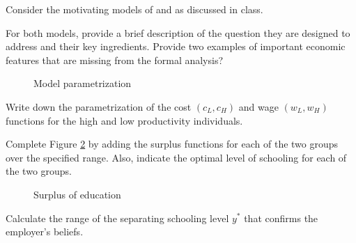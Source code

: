 Consider the motivating models of \cite{Spence.1973} and \cite{Ben-Porath.1967} as discussed in class.

\begin{boenumerate}
\item For both models, provide a brief description of the question they are designed to address and their key ingredients. Provide two examples of important economic features that are missing from the formal analysis?\\


\begin{figure}[h]\centering
\caption{Model parametrization}\label{Model parametrization}
\end{figure}

\item Write down the parametrization of the cost $(c_L, c_H)$ and wage $(w_L, w_H)$ functions for the high and low productivity individuals.

\item Complete Figure \ref{Canvas Surplus} by adding the surplus functions for each of the two groups over the specified range. Also, indicate the optimal level of schooling for each of the two groups.

\begin{figure}[h]\centering
\caption{Surplus of education}\label{Canvas Surplus}
\end{figure}

\item Calculate the range of the separating schooling level $y^*$ that confirms the employer's beliefs.\\



\end{boenumerate}
